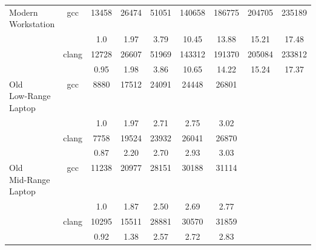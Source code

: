 \begin{table}
\begin{tabularx}{\linewidth}{X c c c c c c c c}
            \midrule
\multirowcell{4}{Modern\\ Workstation} & 
\multirow{2}{*}{gcc} & 13458 & 26474 & 51051 & 140658 & 186775 & 204705 & 235189\\
 & & 1.0 & 1.97 & 3.79 & 10.45 & 13.88 & 15.21 & 17.48\\
\cmidrule[0.05em](){3-9} & 
\multirow{2}{*}{clang} & 12728 & 26607 & 51969 & 143312 & 191370 & 205084 & 233812\\
 & & 0.95 & 1.98 & 3.86 & 10.65 & 14.22 & 15.24 & 17.37\\
            \midrule
\multirowcell{4}{Old\\ Low-Range\\ Laptop} & 
\multirow{2}{*}{gcc} & 8880 & 17512 & 24091 & 24448 & 26801\\
 & & 1.0 & 1.97 & 2.71 & 2.75 & 3.02\\
\cmidrule[0.05em](){3-9} & 
\multirow{2}{*}{clang} & 7758 & 19524 & 23932 & 26041 & 26870\\
 & & 0.87 & 2.20 & 2.70 & 2.93 & 3.03\\
            \midrule
\multirowcell{4}{Old\\ Mid-Range\\ Laptop} & 
\multirow{2}{*}{gcc} & 11238 & 20977 & 28151 & 30188 & 31114\\
 & & 1.0 & 1.87 & 2.50 & 2.69 & 2.77\\
\cmidrule[0.05em](){3-9} & 
\multirow{2}{*}{clang} & 10295 & 15511 & 28881 & 30570 & 31859\\
 & & 0.92 & 1.38 & 2.57 & 2.72 & 2.83 \\
            \bottomrule
        \end{tabularx}
    \end{table}